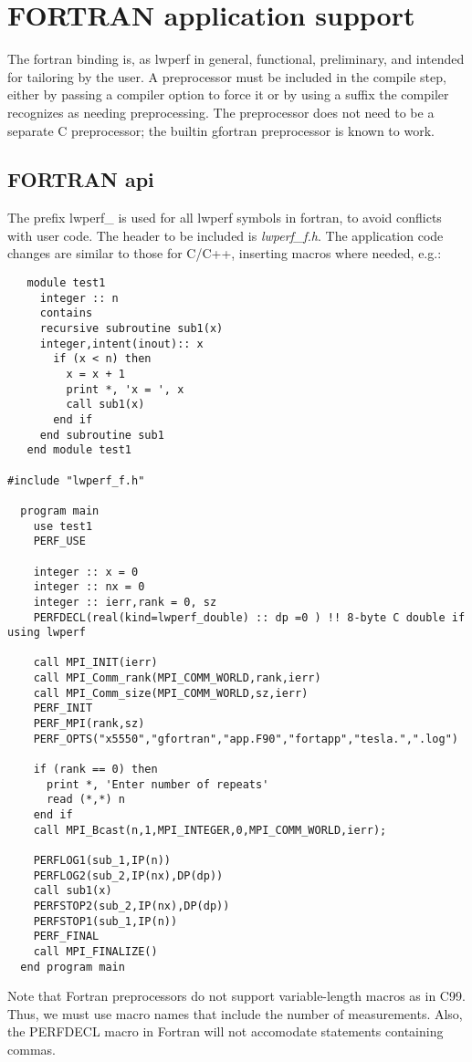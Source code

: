 \chapter{FORTRAN application support}
\label{sec:fortran}
The fortran binding is, as lwperf in general, functional, preliminary, and intended for tailoring by the user.  A preprocessor must be included in the compile step, either by passing a compiler option to force it or by using a suffix the compiler recognizes as needing preprocessing. The preprocessor does not need to be a separate C preprocessor; the builtin gfortran preprocessor is known to work.

\section{FORTRAN api}
\label{sec:fapi}
The prefix lwperf\_ is used for all lwperf symbols in fortran, to avoid conflicts with user code. The header to be included is {\em lwperf\_f.h}.
The application code changes are similar to those for C/C++, inserting macros where needed, e.g.:
\begin{verbatim}
   module test1
     integer :: n
     contains
     recursive subroutine sub1(x)
     integer,intent(inout):: x
       if (x < n) then
         x = x + 1
         print *, 'x = ', x
         call sub1(x)
       end if
     end subroutine sub1
   end module test1

#include "lwperf_f.h"

  program main
    use test1
    PERF_USE

    integer :: x = 0
    integer :: nx = 0
    integer :: ierr,rank = 0, sz
    PERFDECL(real(kind=lwperf_double) :: dp =0 ) !! 8-byte C double if using lwperf

    call MPI_INIT(ierr)
    call MPI_Comm_rank(MPI_COMM_WORLD,rank,ierr)
    call MPI_Comm_size(MPI_COMM_WORLD,sz,ierr)
    PERF_INIT
    PERF_MPI(rank,sz)
    PERF_OPTS("x5550","gfortran","app.F90","fortapp","tesla.",".log") 

    if (rank == 0) then
      print *, 'Enter number of repeats'
      read (*,*) n
    end if
    call MPI_Bcast(n,1,MPI_INTEGER,0,MPI_COMM_WORLD,ierr);

    PERFLOG1(sub_1,IP(n)) 
    PERFLOG2(sub_2,IP(nx),DP(dp))
    call sub1(x)
    PERFSTOP2(sub_2,IP(nx),DP(dp))
    PERFSTOP1(sub_1,IP(n))
    PERF_FINAL
    call MPI_FINALIZE()
  end program main
\end{verbatim}

Note that Fortran preprocessors do not support variable-length macros as in C99. Thus, we must use macro names that include the number of measurements. Also, the PERFDECL macro in Fortran will not
accomodate statements containing commas.


